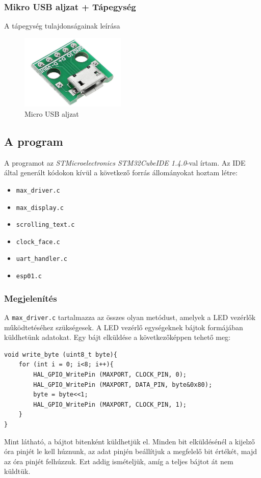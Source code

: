 \documentclass[a4paper, 12pt]{article}
\begin{document}
\subsubsection{Mikro USB aljzat + Tápegység}
A tápegység tulajdonságainak leírása

\begin{figure}[ht]
	\centering
	\includegraphics[width = 5cm]{images/dip5.jpg}
	\caption{Micro USB aljzat}
	\label{fig:dip5}
\end{figure}	

\subsection{A program}

A programot az \textit{STMicroelectronics STM32CubeIDE 1.4.0}-val írtam.
Az IDE által generált kódokon kívül a következő forrás állományokat hoztam létre:
\begin{itemize}[noitemsep]
	\item \texttt{max\_driver.c}
	\item \texttt{max\_display.c}
	\item \texttt{scrolling\_text.c}
	\item \texttt{clock\_face.c}
	\item \texttt{uart\_handler.c}
	\item \texttt{esp01.c}
\end{itemize}

\subsubsection{Megjelenítés}

A \texttt{max\_driver.c} tartalmazza az összes olyan metódust, amelyek a LED vezérlők működtetéséhez szükségesek.
A LED vezérlő egységeknek bájtok formájában küldhetünk adatokat.
Egy bájt elküldése a következőképpen tehető meg:
\begin{lstlisting}[style=CStyle]
void write_byte (uint8_t byte){
	for (int i = 0; i<8; i++){
		HAL_GPIO_WritePin (MAXPORT, CLOCK_PIN, 0);
		HAL_GPIO_WritePin (MAXPORT, DATA_PIN, byte&0x80);
		byte = byte<<1;
		HAL_GPIO_WritePin (MAXPORT, CLOCK_PIN, 1);
	}
}
\end{lstlisting}
Mint látható, a bájtot bitenként küldhetjük el. Minden bit elküldésénél a kijelző óra pinjét le kell húznunk, az adat pinjén beállítjuk a megfelelő bit értékét, majd az óra pinjét felhúzzuk. Ezt addig ismételjük, amíg a teljes bájtot át nem küldtük.
\end{document}
